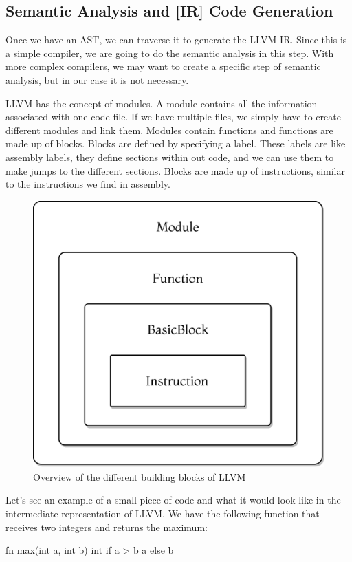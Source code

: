 ﻿\documentclass[10pt,a4paper,twocolumn,twoside]{article}
\begin{document}
\subsection{Semantic Analysis and [IR] Code Generation}
Once we have an AST, we can traverse it to generate the LLVM IR. Since this is a
simple compiler, we are going to do the semantic analysis in this step. With 
more complex compilers, we may want to create a specific step of semantic 
analysis, but in our case it is not necessary.

LLVM has the concept of modules. A module contains all the information
associated with one code file. If we have multiple files, we simply have to
create different modules and link them. Modules contain functions and functions
are made up of blocks. Blocks are defined by specifying a label. These labels
are like assembly labels, they define sections within out code, and we can use
them to make jumps to the different sections. Blocks are made up of
instructions, similar to the instructions we find in assembly.

\begin{figure}[ht]
\centering
\captionsetup{justification=centering,margin=1cm}
\includegraphics[width=0.65\linewidth]{llvm-blocks}
\caption{Overview of the different building blocks of LLVM}
\end{figure}

Let's see an example of a small piece of code and what it would look like in the
intermediate representation of LLVM. We have the following function that
receives two integers and returns the maximum:

\begin{code}
fn max(int a, int b) int {
    if a > b { a } else { b }
}
\end{code}
\end{document}

